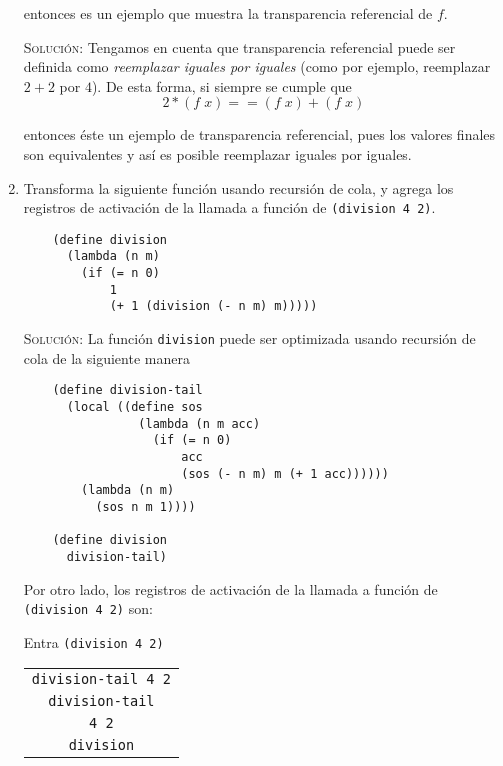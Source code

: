 \documentclass[letterpaper,11pt]{article}
\begin{document}
\begin{enumerate}
    entonces es un ejemplo que muestra la transparencia referencial de $f$.

    \textsc{Solución:} Tengamos en cuenta que transparencia referencial puede 
    ser definida como \textit{reemplazar iguales por iguales} (como por 
    ejemplo, reemplazar $2+2$ por $4$). De esta forma, si siempre se cumple 
    que 
    \begin{equation*}
        2 * (f \; x) == (f \; x) + (f \; x)
    \end{equation*}
    
    entonces éste un ejemplo de transparencia referencial, pues los valores 
    finales son equivalentes y así es posible reemplazar iguales por iguales. 

    \item Transforma la siguiente función usando recursión de cola, y agrega
    los registros de activación de la llamada a función de 
    \texttt{(division 4 2)}.
    \begin{verbatim}
    (define division
      (lambda (n m)
        (if (= n 0)
            1
            (+ 1 (division (- n m) m)))))
    \end{verbatim}

    \textsc{Solución:} La función \texttt{division} puede ser optimizada 
    usando recursión de cola de la siguiente manera 
    \begin{verbatim}
    (define division-tail
      (local ((define sos 
                (lambda (n m acc)
                  (if (= n 0)
                      acc
                      (sos (- n m) m (+ 1 acc))))))
        (lambda (n m)
          (sos n m 1))))

    (define division 
      division-tail)
    \end{verbatim}

    Por otro lado, los registros de activación de la llamada a función de 
    \texttt{(division 4 2)} son:

    Entra \texttt{(division 4 2)}
    \begin{center}
        \begin{tabular}{|c|}
            \hline
            \texttt{division-tail 4 2} \\
            \texttt{division-tail} \\
            \texttt{4 2} \\
            \texttt{division} \\
            \hline
        \end{tabular}
    \end{center}


\end{enumerate}
\end{document}
